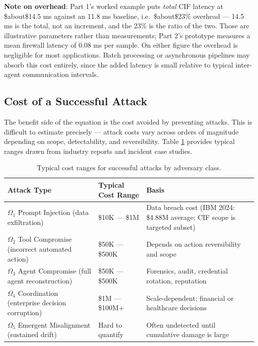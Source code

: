 \documentclass[
]{article}
\begin{document}
\textbf{Note on overhead}: Part 1's worked example puts \emph{total} CIF
latency at \$about\$14.5 ms against an 11.8 ms baseline,
i.e.~\$about\$23\% overhead --- 14.5 ms is the total, not an
increment, and the 23\% is the ratio of the two. Those are illustrative
parameters rather than measurements; Part 2's prototype measures a mean
firewall latency of 0.08 ms per sample. On either figure the overhead is
negligible for most applications. Batch processing or asynchronous
pipelines may absorb this cost entirely, since the added latency is
small relative to typical inter-agent communication intervals.

\subsection{Cost of a Successful
Attack}\label{cost-of-a-successful-attack}

The benefit side of the equation is the cost avoided by preventing
attacks. This is difficult to estimate precisely --- attack costs vary
across orders of magnitude depending on scope, detectability, and
reversibility. Table \ref{tab:attack-costs} provides typical ranges
drawn from industry reports and incident case studies.

\begin{table}[htbp]
\centering
\caption{Typical cost ranges for successful attacks by adversary class.}
\label{tab:attack-costs}
\begin{tabular}{@{}llp{5cm}@{}}
\toprule
Attack Type & Typical Cost Range & Basis \\
\midrule
$\Omega_1$ Prompt Injection (data exfiltration) & \$10K --- \$1M & Data breach cost \cite{ibm2024breachcost} (IBM 2024: \$4.88M average; CIF scope is targeted subset) \\
$\Omega_2$ Tool Compromise (incorrect automated action) & \$50K --- \$500K & Depends on action reversibility and scope \\
$\Omega_3$ Agent Compromise (full agent reconstruction) & \$50K --- \$500K & Forensics, audit, credential rotation, reputation \\
$\Omega_4$ Coordination (enterprise decision corruption) & \$1M --- \$100M+ & Scale-dependent; financial or healthcare decisions \\
$\Omega_5$ Emergent Misalignment (sustained drift) & Hard to quantify & Often undetected until cumulative damage is large \\
\bottomrule
\end{tabular}
\end{table}
\end{document}
